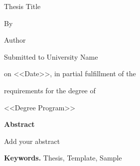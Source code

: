 \label{Abstract}
\newenvironment{tightcenter}{%
	\setlength\topsep{0pt}
	\setlength\parskip{0pt}
	\begin{center}
	}{%
\end{center}
}
\begin{tightcenter}
\large	Thesis Title 
\end{tightcenter}

\begin{tightcenter}
By
\end{tightcenter}
\begin{tightcenter}
	Author
\end{tightcenter}
\hfill \break
\begin{tightcenter} Submitted to University Name \end{tightcenter}
\begin{tightcenter} on <<Date>>, in partial fulfillment of the\end{tightcenter}
\begin{tightcenter} requirements for the degree of \end{tightcenter}
\begin{tightcenter} <<Degree Program>> \end{tightcenter}
\hfill \break
\textbf{Abstract}

Add your abstract

\vspace{10mm}

\textbf{Keywords.} Thesis, Template, Sample